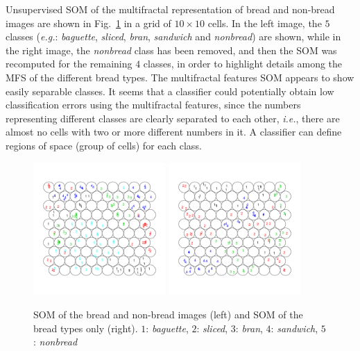 Unsupervised SOM of the multifractal representation of bread and non-bread images are shown in Fig.~\ref{fig:somfractal} in a grid of $10\times10$ cells. In the left image, the $5$ classes ({\em e.g.}: {\em baguette}, {\em sliced}, {\em bran}, {\em sandwich} and {\em nonbread}) are shown, while in the right image, the {\em nonbread} class has been removed, and then the SOM was recomputed for the remaining $4$ classes, in order to highlight details among the MFS of the different bread types. The multifractal features SOM appears to show easily separable classes. It seems that a classifier could potentially obtain low classification errors using the multifractal features, since the numbers representing different classes are clearly separated to each other, {\em i.e.}, there are almost no cells with two or more different numbers in it. A classifier can define regions of space (group of cells) for each class.
\begin{figure}
\begin{centering}
\includegraphics[width=0.45\textwidth]{../exps/som/sommultifractal}
\includegraphics[width=0.45\textwidth]{../exps/som/sombreadmultifractal}
\caption{SOM of the bread and non-bread images (left) and SOM of the bread types only (right). $1$: {\em baguette}, $2$: {\em sliced}, $3$: {\em bran}, $4$: {\em sandwich}, $5$: {\em nonbread} }
\label{fig:somfractal}
\end{centering}
\end{figure}

